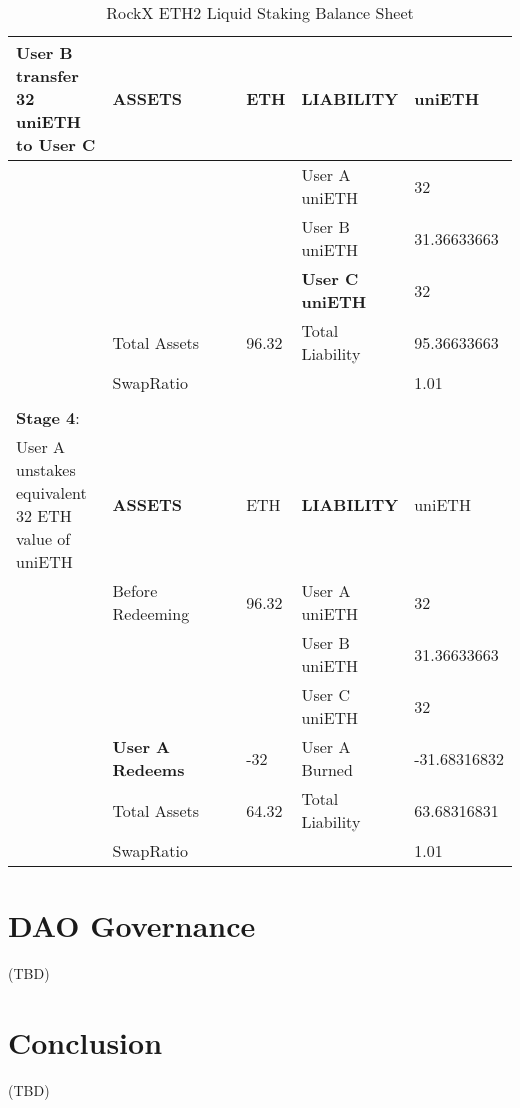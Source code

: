 \documentclass{article}
\begin{document}
\begin{table}[!ht]
\begin{tabular}{p{0.2\linewidth} | p{0.3\linewidth}| p{0.1\linewidth}| p{0.2\linewidth}| p{0.2\linewidth}}
        User B transfer 32 uniETH to User C & \textbf{ASSETS} & ETH & \textbf{LIABILITY} & uniETH \\ \hline
        ~ & ~ & ~ & User A uniETH & 32 \\ \hline
        ~ & ~ & ~ & User B uniETH & 31.36633663 \\ \hline
        ~ & ~ & ~ & \textbf{User C uniETH} & 32 \\ \hline
        ~ & Total Assets & 96.32 & Total Liability & 95.36633663 \\ \hline
        ~ & SwapRatio & ~ & ~ & 1.01 \\ \hline
        \multicolumn{5}{c}{} \\ \hline
        \textbf{Stage 4}: & ~ & ~ & ~ & ~ \\ \hline
          User A unstakes equivalent 32 ETH value of uniETH & \textbf{ASSETS} & ETH & \textbf{LIABILITY} & uniETH \\ \hline
        ~ & Before Redeeming & 96.32 & User A uniETH & 32 \\ \hline
        ~ & ~ & ~ & User B uniETH & 31.36633663 \\ \hline
        ~ & ~ & ~ & User C uniETH & 32 \\ \hline
        ~ & \textbf{User A Redeems} & -32 & User A Burned & -31.68316832 \\ \hline
        ~ & Total Assets & 64.32 & Total Liability & 63.68316831 \\ \hline
        ~ & SwapRatio & ~ & ~ & 1.01 \\ \hline
    \end{tabular}
    \caption{RockX ETH2 Liquid Staking Balance Sheet}
\end{table}

\section{DAO Governance}
(TBD)
\section{Conclusion}
(TBD)
\end{document}
